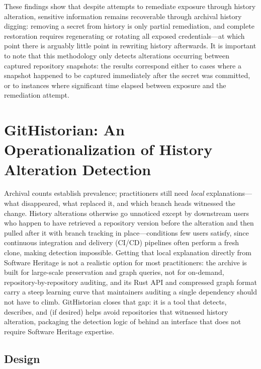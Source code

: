 These findings show that despite attempts to remediate exposure through history alteration, sensitive information remains recoverable through archival history digging: removing a secret from history is only partial remediation, and complete restoration requires regenerating or rotating all exposed credentials---at which point there is arguably little point in rewriting history afterwards.
It is important to note that this methodology only detects alterations occurring between captured repository snapshots: the results correspond either to cases where a snapshot happened to be captured immediately after the secret was committed, or to instances where significant time elapsed between exposure and the remediation attempt.

\section{GitHistorian: An Operationalization of History Alteration Detection}
\label{sec:hist-githistorian}

Archival counts establish prevalence; practitioners still need \emph{local} explanations---what disappeared, what replaced it, and which branch heads witnessed the change.
History alterations otherwise go unnoticed except by downstream users who happen to have retrieved a repository version before the alteration and then pulled after it with branch tracking in place---conditions few users satisfy, since continuous integration and delivery (CI/CD) pipelines often perform a fresh clone, making detection impossible.
Getting that local explanation directly from Software Heritage is not a realistic option for most practitioners: the archive is built for large-scale preservation and graph queries, not for on-demand, repository-by-repository auditing, and its Rust API and compressed graph format carry a steep learning curve that maintainers auditing a single dependency should not have to climb.
GitHistorian closes that gap: it is a tool that detects, describes, and (if desired) helps avoid repositories that witnessed history alteration, packaging the detection logic of  behind an interface that does not require Software Heritage expertise.

\subsection{Design}
\label{subsec:hist-gh-goals}

